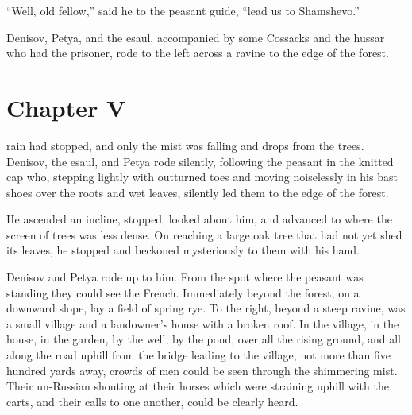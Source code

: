 ``Well, old fellow,'' said he to the peasant guide, ``lead us to
Shamshevo.''

Denisov, Petya, and the esaul, accompanied by some Cossacks and
the hussar who had the prisoner, rode to the left across a ravine
to the edge of the forest.


\chapter*{Chapter V} \ifaudio {}
\fi

 rain had stopped, and only the mist was falling and drops
from the trees. Denisov, the esaul, and Petya rode silently,
following the peasant in the knitted cap who, stepping lightly
with outturned toes and moving noiselessly in his bast shoes over
the roots and wet leaves, silently led them to the edge of the
forest.

He ascended an incline, stopped, looked about him, and advanced
to where the screen of trees was less dense. On reaching a large
oak tree that had not yet shed its leaves, he stopped and
beckoned mysteriously to them with his hand.

Denisov and Petya rode up to him. From the spot where the peasant
was standing they could see the French. Immediately beyond the
forest, on a downward slope, lay a field of spring rye. To the
right, beyond a steep ravine, was a small village and a
landowner's house with a broken roof.  In the village, in the
house, in the garden, by the well, by the pond, over all the
rising ground, and all along the road uphill from the bridge
leading to the village, not more than five hundred yards away,
crowds of men could be seen through the shimmering mist. Their
un-Russian shouting at their horses which were straining uphill
with the carts, and their calls to one another, could be clearly
heard.

